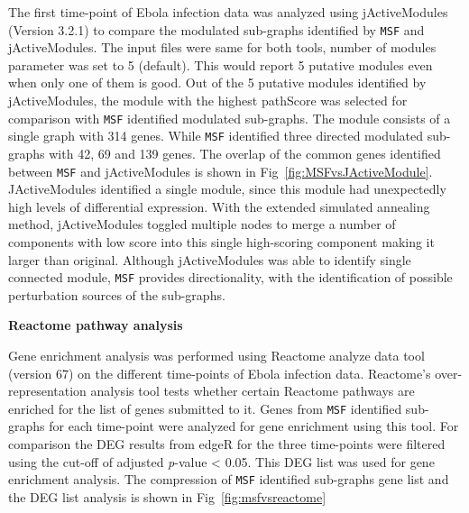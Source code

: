 \documentclass[10pt,a4paper,twocolumn]{article}
\newcommand{\DONE}[1]{\begingroup\color{blue}#1\endgroup}
\begin{document}
	The first time-point of Ebola infection data was analyzed
        using jActiveModules (Version 3.2.1) to compare the modulated
        sub-graphs identified by \texttt{MSF} and jActiveModules. The
        input files were same for both tools, number of modules
        parameter was set to 5 (default). This would report 5 putative modules even when only one of them is good. Out of the 5 putative modules identified by jActiveModules, the module with the highest pathScore was selected for comparison with
        \texttt{MSF} identified modulated sub-graphs. The module consists of a single graph with 314
        genes. While \texttt{MSF} identified three directed modulated
        sub-graphs with 42, 69 and 139 genes. The overlap of the
        common genes identified between \texttt{MSF} and jActiveModules
        is shown in Fig~\ref{fig:MSFvsJActiveModule}. \DONE{JActiveModules identified a single module, since this module had unexpectedly high levels of differential expression. With the extended simulated annealing method, jActiveModules toggled multiple nodes to merge a number of components with low score into this single high-scoring component making it larger than original.} Although jActiveModules was able to identify
        single connected module, \texttt{MSF} provides directionality,
        with the identification of possible perturbation sources of
        the sub-graphs. 
        
     

	\textbf{Reactome pathway analysis}
	
	Gene enrichment analysis was performed using Reactome analyze
        data tool~\cite{Reactome} (version 67) on the different time-points of Ebola infection data. Reactome's over-representation analysis tool tests
        whether certain Reactome pathways are enriched for the list of
        genes submitted to it. Genes from \texttt{MSF} identified
        sub-graphs for each time-point were analyzed for gene
        enrichment using this tool.  For comparison the DEG results
        from edgeR for the three time-points were filtered using the
        cut-off of adjusted \textit{p}-value < 0.05. This
        DEG list was used for gene enrichment analysis. The
        compression of \texttt{MSF} identified sub-graphs gene list
        and the DEG list analysis is shown in
        Fig~\ref{fig:msfvsreactome}
	
\end{document}
